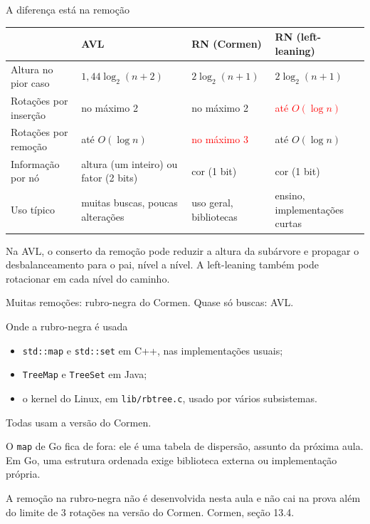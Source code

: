 \documentclass{beamer}
\newcommand{\tcr}[1]{\textcolor{red}{#1}}
\begin{document}
\begin{frame}{A diferença está na remoção}
	\begin{center}
		\scriptsize
		\begin{tabular}{>{\raggedright\arraybackslash}p{2.1cm}
			>{\raggedright\arraybackslash}p{2.6cm}
			>{\raggedright\arraybackslash}p{2.1cm}
			>{\raggedright\arraybackslash}p{2.3cm}}
			\toprule
			                      & \textbf{AVL}                          & \textbf{RN (Cormen)}   & \textbf{RN (left-leaning)}    \\
			\midrule
			Altura no pior caso   & $1{,}44\log_2(n+2)$                   & $2\log_2(n+1)$         & $2\log_2(n+1)$                \\
			Rotações por inserção & no máximo 2                           & no máximo 2            & \tcr{até $O(\log n)$}         \\
			Rotações por remoção  & até $O(\log n)$                       & \tcr{no máximo 3}      & até $O(\log n)$               \\
			Informação por nó     & altura (um inteiro) ou fator (2 bits) & cor (1 bit)            & cor (1 bit)                   \\
			Uso típico            & muitas buscas, poucas alterações      & uso geral, bibliotecas & ensino, implementações curtas \\
			\bottomrule
		\end{tabular}
	\end{center}

	\vspace{0.2cm}
	\small
	Na AVL, o conserto da remoção pode reduzir a altura da subárvore e propagar o
	desbalanceamento para o pai, nível a nível. A left-leaning também pode
	rotacionar em cada nível do caminho.

	\vspace{0.2cm}
	Muitas remoções: rubro-negra do Cormen. Quase só buscas: AVL.
\end{frame}

\begin{frame}{Onde a rubro-negra é usada}
	\begin{itemize}
		\item \texttt{std::map} e \texttt{std::set} em C++, nas implementações
		      usuais;
		\item \texttt{TreeMap} e \texttt{TreeSet} em Java;
		\item o kernel do Linux, em \texttt{lib/rbtree.c}, usado por vários
		      subsistemas.
	\end{itemize}

	\vspace{0.2cm}
	Todas usam a versão do Cormen.

	\vspace{0.5cm}
	O \texttt{map} de Go fica de fora: ele é uma tabela de dispersão, assunto da
	próxima aula. Em Go, uma estrutura ordenada exige biblioteca externa ou
	implementação própria.

	\vspace{0.3cm}
	\footnotesize A remoção na rubro-negra não é desenvolvida nesta aula e não cai
	na prova além do limite de 3 rotações na versão do Cormen. Cormen, seção
	13.4.
\end{frame}
\end{document}
